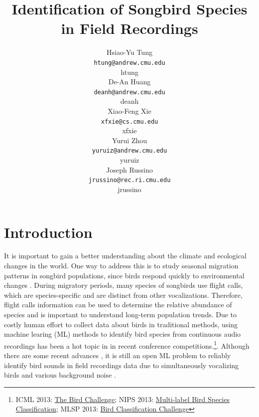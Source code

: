 \documentclass{article} %
\title{Identification of Songbird Species in Field Recordings}
\author{
Hsiao-Yu Tung \\
\texttt{htung@andrew.cmu.edu} \\
htung \\
\And
De-An Huang \\
\texttt{deanh@andrew.cmu.edu} \\
deanh \\
\And
Xiao-Feng Xie \\
\texttt{xfxie@cs.cmu.edu} \\
xfxie \\
\And
Yurui Zhou\\
\texttt{yuruiz@andrew.cmu.edu}\\
yuruiz \\
\And
Joseph Russino\\
\texttt{jrussino@rec.ri.cmu.edu}\\
jrussino \\
}
\begin{document}
\maketitle


\section{Introduction}

It is important to gain a better understanding about the climate and ecological changes in the world. One way to address this is to study seasonal migration patterns in songbird populations, since birds respond quickly to environmental changes \cite{walther2002ecological}.
During migratory periods, many species of songbirds use flight calls, which are species-specific and are distinct from other vocalizations. Therefore, flight calls information can be used to determine the relative abundance of species and is important to understand long-term population trends. Due to costly human effort to collect data about birds in traditional methods, using machine learing (ML) methods to identify bird species from continuous audio recordings has been a hot topic in in recent conference competitions.\footnote{\scriptsize ICML 2013: \href{http://www.kaggle.com/c/the-icml-2013-bird-challenge}{The Bird Challenge}; NIPS 2013: \href{http://www.kaggle.com/c/multi-label-bird-species-classification-nips2013}{
Multi-label Bird Species Classification}; MLSP 2013: \href{http://www.kaggle.com/c/mlsp-2013-birds}{Bird Classification Challenge}}. Although there are some recent advances \cite{briggs2013instance,Lasseck13,Massaron13,stattnersong13}, it is still an open ML problem to reliably identify bird sounds in field recordings data due to simultaneously vocalizing birds and various background noise \cite{BriggsMLSP13}.
\end{document}
